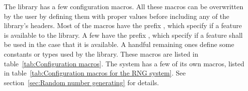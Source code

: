 The library has a few configuration macros. All these macros can be overwritten
by the user by defining them with proper values before including any of the
library's headers. Most of the macros have the prefix ,
which specify if a feature is available to the library. A few have the prefix
, which specify if a feature shall be used in the case
that it is available. A handful remaining ones define some constants or types
used by the library. These macros are listed in table~\ref{tab:Configuration
  macros}. The \rng system has a few of its own macros, listed in
table~\ref{tab:Configuration macros for the RNG system}. See
section~\ref{sec:Random number generating} for details.
